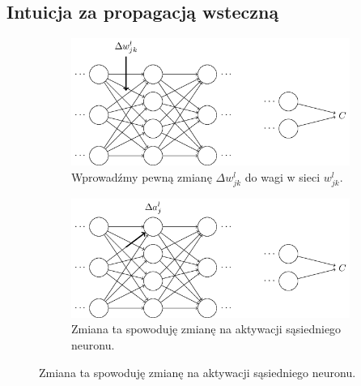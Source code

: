 \documentclass[10pt, oneside]{article}
\theoremstyle{remark}
\begin{document}
\subsection{Intuicja za propagacją wsteczną}


\begin{figure}[!htpb]
	\begin{subfigure}{.5\textwidth}
	  \centering
	  \includegraphics[width=.95\linewidth]{figures/tikz22}
	  \caption{Wprowadźmy pewną zmianę $\Delta w^l_{jk}$ do wagi w sieci $w^l_{jk}$.}
	  \label{fig:sfig1}
	\end{subfigure}%
	\begin{subfigure}{.5\textwidth}
	  \centering
	  \includegraphics[width=.95\linewidth]{figures/tikz23}
	  \caption{Zmiana ta spowoduję zmianę na aktywacji sąsiedniego neuronu.}
	  \label{fig:sfig1}
	\end{subfigure}
	

\end{figure}
\end{document}
